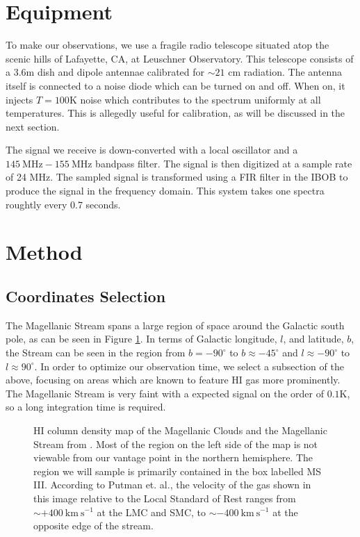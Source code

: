 \documentclass[12pt]{article}
\begin{document}
\section{Equipment}
To make our observations, we use a fragile radio telescope situated atop the scenic hills of Lafayette, CA, at Leuschner Observatory. This telescope consists of a 3.6m dish and dipole antennae calibrated for $\sim21$ cm radiation. The antenna itself is connected to a noise diode which can be turned on and off. When on, it injects $T=100\mathrm{K}$ noise which contributes to the spectrum uniformly at all temperatures. This is allegedly useful for calibration, as will be discussed in the next section.

The signal we receive is down-converted with a local oscillator and a $145\ \mathrm{MHz}-155\ \mathrm{MHz}$ bandpass filter. The signal is then digitized at a sample rate of 24 MHz. The sampled signal is transformed using a FIR filter in the IBOB to produce the signal in the frequency domain. This system takes one spectra roughtly every 0.7 seconds.

\section{Method}

\subsection*{Coordinates Selection}
The Magellanic Stream spans a large region of space around the Galactic south pole, as can be seen in Figure \ref{fig:mag-map}. In terms of Galactic longitude, $l$, and latitude, $b$, the Stream can be seen in the region from $b=-90^\circ$ to $b\approx-45^\circ$ and $l\approx-90^\circ$ to $l\approx90^\circ$. In order to optimize our observation time, we select a subsection of the above, focusing on areas which are known to feature HI gas more prominently. The Magellanic Stream is very faint with a expected signal on the order of $0.1\mathrm{K}$, so a long integration time is required.

\begin{figure}[H]
\caption[SODUMB]{HI column density map of the Magellanic Clouds and the Magellanic Stream from \citet{Putman2003}. Most of the region on the left side of the map is not viewable from our vantage point in the northern hemisphere. The region we will sample is primarily contained in the box labelled MS III. According to Putman et. al., the velocity of the gas shown in this image relative to the Local Standard of Rest ranges from $\sim
+400\ \mathrm{km\ s^{-1}}$ at the LMC and SMC, to $\sim-400\ \mathrm{km\ s^{-1}}$ at the opposite edge of the stream.
}
\label{fig:mag-map}
\end{figure}
\end{document}
